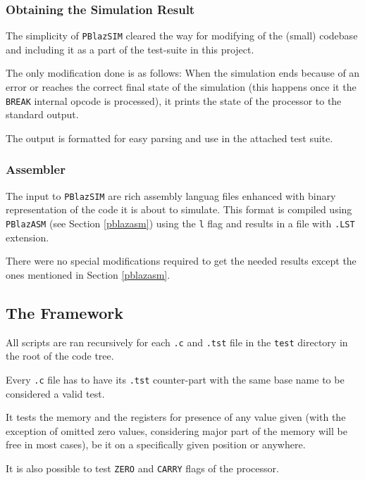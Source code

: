             \subsubsection{Obtaining the Simulation Result}

                The simplicity of \texttt{PBlazSIM} cleared the way for modifying of the (small) codebase and including it as a part of the test-suite in this project.

                The only modification done is as follows: When the simulation ends because of an error or reaches the correct final state of the simulation (this happens once it  the \texttt{BREAK} internal opcode is processed), it prints the state of the processor to the standard output.

                The output is formatted for easy parsing and use in the attached test suite.

            \subsubsection{Assembler}

                The input to \texttt{PBlazSIM} are rich assembly languag files enhanced with binary representation of the code it is about to simulate. This format is compiled using \texttt{PBlazASM} (see Section \ref{pblazasm}) using the \texttt{\-l} flag and results in a file with \texttt{.LST} extension.

                There were no special modifications required to get the needed results except the ones mentioned in Section \ref{pblazasm}.

        \subsection{The Framework}

        All scripts are ran recursively for each \texttt{.c} and \texttt{.tst} file in the \texttt{test} directory in the root of the code tree.

        Every \texttt{.c} file has to have its \texttt{.tst} counter-part with the same base name to be considered a valid test.

        It tests the memory and the registers for presence of any value given (with the exception of omitted zero values, considering major part of the memory will be free in most cases), be it on a specifically given position or anywhere.

        It is also possible to test \texttt{ZERO} and \texttt{CARRY} flags of the processor.

